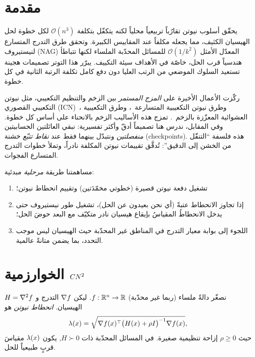 \section{مقدمة}
\label{sec:intro-ar}

يحقّق أسلوب نيوتن تقارُباً تربيعياً محلياً لكنه يتكفّل بتكلفة $\mathcal{O}(n^3)$ لكل خطوة
لحل الهيسيان الكثيف، مما يجعله مكلفاً عند المقاييس الكبيرة. وتحقق طرق التدرج المتسارع
لنيستيروف (NAG) المعدّل الأمثل $\mathcal{O}(1/k^2)$ للمسائل المحدّبة الملساء لكنها تتباطأ
هندسياً قرب الحل، خاصّة في الأهداف سيئة التكييف. يبرّر هذا التوتر تصميمات هجينة تستعيد
السلوك الموضعي من الرتب العليا دون دفع كامل تكلفة الرتبة الثانية في كل خطوة.

ركّزت الأعمال الأخيرة على \emph{المزج المستمر} بين الزخم والتنظيم التكعيبي، مثل نيوتن
التكعيبي القصوري (ICN)~\cite{icn2026}، وطرق نيوتن التكعيبية المتسارعة~\cite{optami2025}،
وطرق التكعيبية العشوائية المعزّزة بالزخم~\cite{aistats2025}. تمزج هذه الأساليب الزخم
بالانحناء على أساس كل خطوة. وفي المقابل، ندرس هنا تصميماً أدقّ وأكثر تفسيرية: نبقي
العائلتين الحسابيتين \emph{منفصلتين} ونتبدّل بينهما فقط عند \emph{نقاط تتبّع} خشنة
(checkpoints). هذه فلسفة ``التنقّل من الخشن إلى الدقيق'': تُدقَّق تقييمات نيوتن المكلفة
نادراً، وتملأ خطوات التدرج المتسارع الفجوات.

مساهمتنا طريقة \emph{مرحلية} مبدئية:
\begin{enumerate}
\item تشغيل دفعة نيوتن قصيرة (خطوتي مخمّدَتين) وتقييم انحطاط نيوتن؛
\item إذا تجاوز الانحطاط عتبةً (أي نحن بعيدون عن الحل)، تشغيل طور نيستيروف حتى
      يدخل الانحطاطُ المقياسُ بإيقاع هيسيان نادر متكيّف مع البعد حوضَ الحل؛
\item اللجوء إلى بوابة معيار التدرج في المناطق غير المحدّبة حيث الهيسيان ليس موجب
      التحدد، بما يضمن متانةً عالمية.
\end{enumerate}

\section{الخوارزمية $\cn$}
\label{sec:method-ar}

نصغّر دالةً ملساء (ربما غير محدّبة) $f:\R^n\to\R$. ليكن $\grad f$ التدرج و
$H=\grad^2 f$ الهيسيان. \emph{انحطاط نيوتن} هو
\begin{equation}
\label{eq:lambda-ar}
\lam(x)=\sqrt{\grad f(x)^{\top}\big(H(x)+\rho I\big)^{-1}\grad f(x)},
\end{equation}
حيث $\rho\ge0$ إزاحة تنظيمية صغيرة. في المسائل المحدّبة ذات $H\succ 0$, يكون $\lam(x)$
مقياسَ قربٍ طبيعياً للحل.

